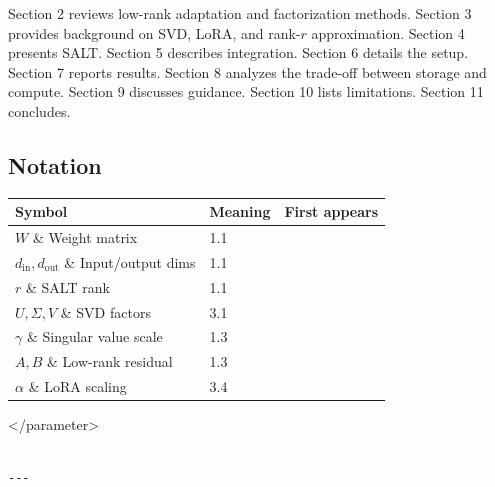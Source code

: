 Section 2 reviews low-rank adaptation and factorization methods. Section 3 
provides background on SVD, LoRA, and rank-$r$ approximation. Section 4 
presents SALT. Section 5 describes integration. Section 6 details the setup. 
Section 7 reports results. Section 8 analyzes the trade-off between storage 
and compute. Section 9 discusses guidance. Section 10 lists limitations. 
Section 11 concludes.



\subsection{Notation}

\begin{table}[H]
\centering
\small
\begin{tabular}{lll}
\toprule
\textbf{Symbol} & \textbf{Meaning} & \textbf{First appears} \\
\midrule
$W$ \& Weight matrix & 1.1 \\
$d_\text{in}, d_\text{out}$ \& Input/output dims & 1.1 \\
$r$ \& SALT rank & 1.1 \\
$U, \Sigma, V$ \& SVD factors & 3.1 \\
$\gamma$ \& Singular value scale & 1.3 \\
$A, B$ \& Low-rank residual & 1.3 \\
$\alpha$ \& LoRA scaling & 3.4 \\
\bottomrule
\end{tabular}
\end{table}
\textless{}/parameter\textgreater{}
\begin{lstlisting}

---
\end{lstlisting}